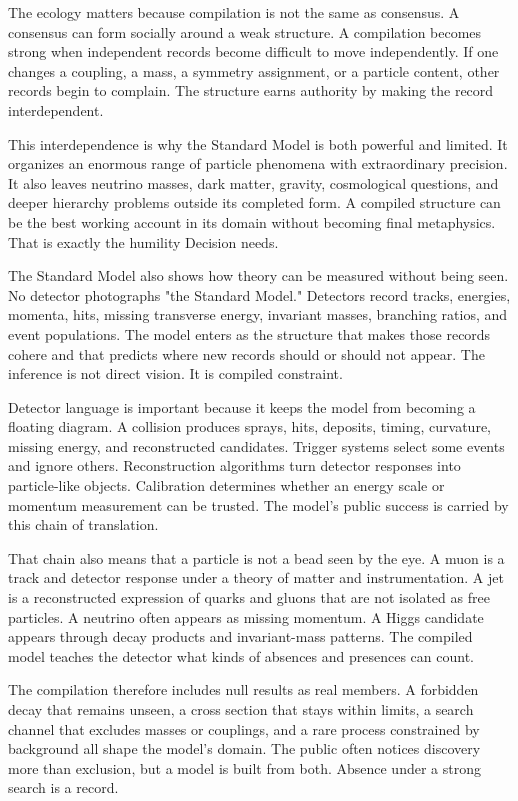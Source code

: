 The ecology matters because compilation is not the same as consensus. A
consensus can form socially around a weak structure. A compilation becomes
strong when independent records become difficult to move independently. If
one changes a coupling, a mass, a symmetry assignment, or a particle content,
other records begin to complain. The structure earns authority by making the
record interdependent.

This interdependence is why the Standard Model is both powerful and limited.
It organizes an enormous range of particle phenomena with extraordinary
precision. It also leaves neutrino masses, dark matter, gravity, cosmological
questions, and deeper hierarchy problems outside its completed form. A
compiled structure can be the best working account in its domain without
becoming final metaphysics. That is exactly the humility Decision needs.

The Standard Model also shows how theory can be measured without being seen.
No detector photographs "the Standard Model." Detectors record tracks,
energies, momenta, hits, missing transverse energy, invariant masses,
branching ratios, and event populations. The model enters as the structure
that makes those records cohere and that predicts where new records should or
should not appear. The inference is not direct vision. It is compiled
constraint.

Detector language is important because it keeps the model from becoming a
floating diagram. A collision produces sprays, hits, deposits, timing,
curvature, missing energy, and reconstructed candidates. Trigger systems
select some events and ignore others. Reconstruction algorithms turn detector
responses into particle-like objects. Calibration determines whether an
energy scale or momentum measurement can be trusted. The model's public
success is carried by this chain of translation.

That chain also means that a particle is not a bead seen by the eye. A muon
is a track and detector response under a theory of matter and instrumentation.
A jet is a reconstructed expression of quarks and gluons that are not isolated
as free particles. A neutrino often appears as missing momentum. A Higgs
candidate appears through decay products and invariant-mass patterns. The
compiled model teaches the detector what kinds of absences and presences can
count.

The compilation therefore includes null results as real members. A forbidden
decay that remains unseen, a cross section that stays within limits, a search
channel that excludes masses or couplings, and a rare process constrained by
background all shape the model's domain. The public often notices discovery
more than exclusion, but a model is built from both. Absence under a strong
search is a record.

